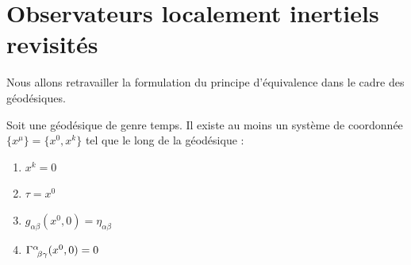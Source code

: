 \section{Observateurs localement inertiels revisités}
Nous allons retravailler la formulation du principe d'équivalence dans le cadre des géodésiques.
\begin{theoremframe}
    \begin{theorem}
        Soit une géodésique de genre temps. Il existe au moins un système de coordonnée $\{x^{\mu}\} = \{x^0 , x^k\}$ tel que le long de la géodésique :
        \begin{enumerate}[label = \roman*.]
            \item $x^k = 0$
            \item $\tau = x^0$ 
            \item $g_{\alpha \beta}(x^0, 0) = \eta_{\alpha \beta}$
            \item $\Gamma\indices{^{\alpha}_{\!\beta \gamma}}(x^0, 0) = 0$
        \end{enumerate}
    \end{theorem}
\end{theoremframe}
